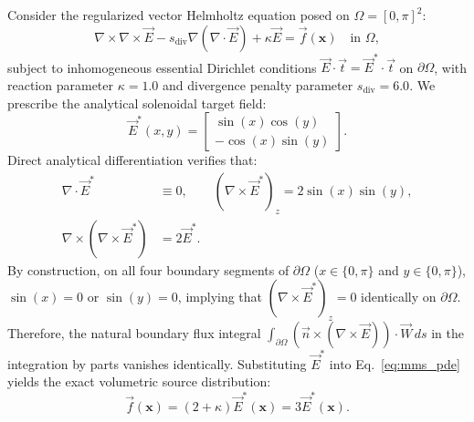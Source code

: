\documentclass[preprint,12pt]{elsarticle}
\begin{document}
Consider the regularized vector Helmholtz equation posed on $\Omega = [0, \pi]^2$:
\begin{equation}
    \nabla \times \nabla \times \vec{E} - s_{\mathrm{div}} \nabla(\nabla \cdot \vec{E}) + \kappa \vec{E} = \vec{f}(\mathbf{x}) \quad \text{in } \Omega,
    \label{eq:mms_pde}
\end{equation}
subject to inhomogeneous essential Dirichlet conditions $\vec{E} \cdot \vec{t} = \vec{E}^* \cdot \vec{t}$ on $\partial\Omega$, with reaction parameter $\kappa = 1.0$ and divergence penalty parameter $s_{\mathrm{div}} = 6.0$. We prescribe the analytical solenoidal target field:
\begin{equation}
    \vec{E}^*(x, y) = \begin{bmatrix} \sin(x)\cos(y) \\[2pt] -\cos(x)\sin(y) \end{bmatrix}.
    \label{eq:mms_target_field}
\end{equation}
Direct analytical differentiation verifies that:
\begin{align}
    \nabla \cdot \vec{E}^*                  & \equiv 0, \qquad (\nabla \times \vec{E}^*)_z = 2\sin(x)\sin(y), \\
    \nabla \times (\nabla \times \vec{E}^*) & = 2\vec{E}^*.
\end{align}
By construction, on all four boundary segments of $\partial\Omega$ ($x \in \{0, \pi\}$ and $y \in \{0, \pi\}$), $\sin(x) = 0$ or $\sin(y) = 0$, implying that $(\nabla \times \vec{E}^*)_z = 0$ identically on $\partial\Omega$. Therefore, the natural boundary flux integral $\int_{\partial\Omega} (\vec{n} \times (\nabla \times \vec{E})) \cdot \vec{W}\, ds$ in the integration by parts vanishes identically. Substituting $\vec{E}^*$ into Eq.~\eqref{eq:mms_pde} yields the exact volumetric source distribution:
\begin{equation}
    \vec{f}(\mathbf{x}) = (2 + \kappa)\vec{E}^*(\mathbf{x}) = 3\vec{E}^*(\mathbf{x}).
    \label{eq:mms_source_term}
\end{equation}
\end{document}
